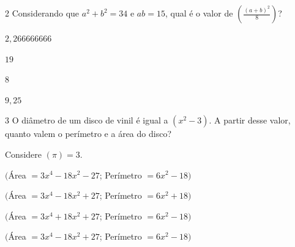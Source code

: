 
\num{2} Considerando que $a^2+ b^2 = 34$ e $ab= 15$, qual é o valor de
$(\frac{(a + b)^2}{8})$?

\begin{escolha}
\item $2,266666666$
\item $19$
\item  $8$ 
\item $9,25$
\end{escolha}










\num{3} O diâmetro de um disco de vinil é igual a $(x^2 - 3)$. A partir desse
valor, quanto valem o perímetro e a área do disco?

Considere $(\pi) = 3$.

\begin{escolha}
\item $($Área $= 3x^4 - 18x^2 - 27$; Perímetro $= 6x^2 - 18)$
\item $($Área $= 3x^4 - 18x^2 + 27$; Perímetro $= 6x^2 + 18)$
\item $($Área $= 3x^4 + 18x^2 + 27$; Perímetro $= 6x^2 - 18)$
\item  $($Área $= 3x^4 - 18x^2 + 27$; Perímetro $= 6x^2 - 18)$ 
\end{escolha}


